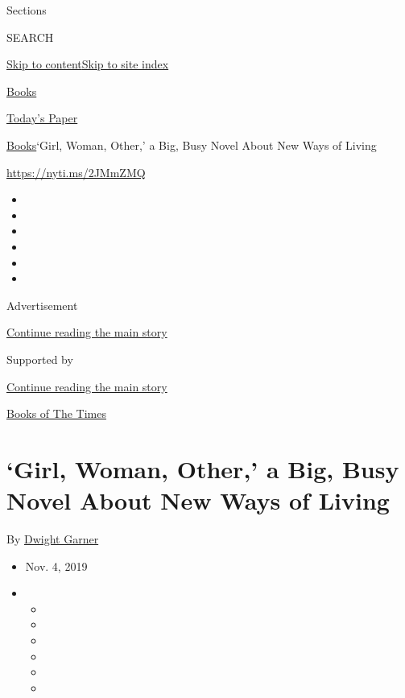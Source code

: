 Sections

SEARCH

\protect\hyperlink{site-content}{Skip to
content}\protect\hyperlink{site-index}{Skip to site index}

\href{https://www.nytimes.com/section/books}{Books}

\href{https://myaccount.nytimes.com/auth/login?response_type=cookie\&client_id=vi}{}

\href{https://www.nytimes.com/section/todayspaper}{Today's Paper}

\href{/section/books}{Books}\textbar{}`Girl, Woman, Other,' a Big, Busy
Novel About New Ways of Living

\url{https://nyti.ms/2JMmZMQ}

\begin{itemize}
\item
\item
\item
\item
\item
\item
\end{itemize}

Advertisement

\protect\hyperlink{after-top}{Continue reading the main story}

Supported by

\protect\hyperlink{after-sponsor}{Continue reading the main story}

\href{/column/books-of-the-times}{Books of The Times}

\hypertarget{girl-woman-other-a-big-busy-novel-about-new-ways-of-living}{%
\section{`Girl, Woman, Other,' a Big, Busy Novel About New Ways of
Living}\label{girl-woman-other-a-big-busy-novel-about-new-ways-of-living}}

By \href{https://www.nytimes.com/by/dwight-garner}{Dwight Garner}

\begin{itemize}
\item
  Nov. 4, 2019
\item
  \begin{itemize}
  \item
  \item
  \item
  \item
  \item
  \item
  \end{itemize}
\end{itemize}

